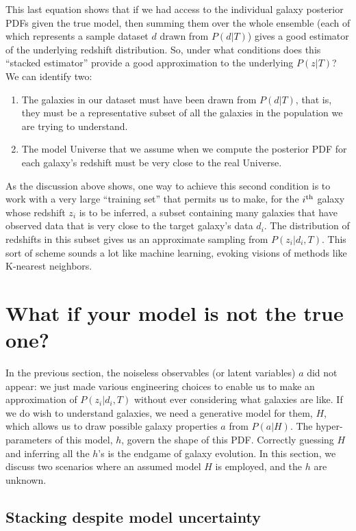 \documentclass[11pt]{amsart}
\begin{document}
This last equation shows that {\it} if we had access to the individual
galaxy posterior PDFs given the true model, then summing them over the
whole ensemble (each of which represents a sample dataset $d$ drawn from
$P(d|T)$) gives a good estimator of the underlying redshift
distribution. So, under what conditions does this ``stacked estimator''
provide a good approximation to the underlying $P(z|T)$? We can identify
two:
\begin{enumerate}
\item The galaxies in our dataset must have been drawn from $P(d|T)$, that is, they must be a representative subset of all the galaxies in the population we are trying to understand.
\item The model Universe that we assume when we compute the posterior PDF for each galaxy's redshift must be very close to the real Universe.
\end{enumerate}
As the discussion above shows, one way to achieve this second condition
is to work with a very large ``training set'' that permits us to make,
for the $i^{\rm th}$ galaxy whose redshift $z_i$ is to be inferred, a
subset  containing many galaxies that have observed data that is very
close to the target galaxy's data $d_i$. The distribution of redshifts
in this subset gives us an approximate sampling from $P(z_i|d_i,T)$.
This sort of scheme sounds a lot like machine learning, evoking visions
of methods like K-nearest neighbors.


\section{What if your model is not the true one?}

In the previous section, the noiseless observables (or latent variables) $a$ did not appear: we just made various engineering choices to enable us to make an approximation of $P(z_i|d_i,T)$ without ever considering what galaxies are like. If we do wish to understand galaxies, we need a generative model for them, $H$, which allows us to draw possible galaxy properties $a$ from $P(a|H)$. The hyper-parameters of this model, $h$, govern the shape of this PDF. Correctly guessing $H$ and inferring all the $h$'s is the endgame of galaxy evolution. In this section, we discuss two scenarios where an assumed model $H$ is employed, and the $h$ are unknown.


\subsection{Stacking despite model uncertainty}
\end{document}
